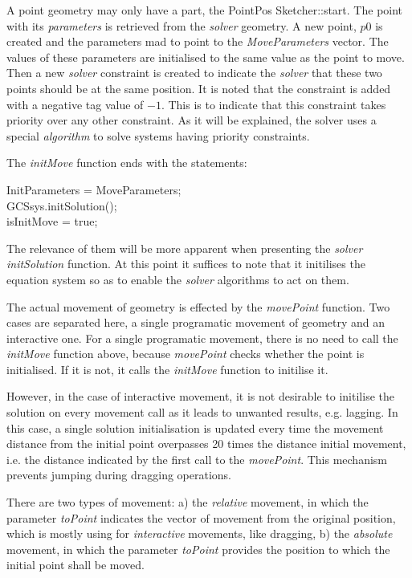 \documentclass[12pt,twoside,a4paper]{book}
\begin{document}
    A point geometry may only have a part, the PointPos Sketcher::start. The point with its \emph{parameters} is retrieved from the \emph{solver} geometry. A new point, $p0$ is created and the parameters mad to point to the \emph{MoveParameters} vector. The values of these parameters are initialised to the same value as the point to move. Then a new \emph{solver} constraint is created to indicate the \emph{solver} that these two points should be at the same position. It is noted that the constraint is added with a negative tag value of $-1$. This is to indicate that this constraint takes priority over any other constraint. As it will be explained, the solver uses a special \emph{algorithm} to solve systems having priority constraints.

    The \emph{initMove} function ends with the statements:

    \begin{codequote}
    InitParameters = MoveParameters;\\
    GCSsys.initSolution();\\
    isInitMove = true;\\
    \end{codequote}

    The relevance of them will be more apparent when presenting the \emph{solver} \emph{initSolution} function. At this point it suffices to note that it initilises the equation system so as to enable the \emph{solver} algorithms to act on them.

    The actual movement of geometry is effected by the \emph{movePoint} function. Two cases are separated here, a single programatic movement of geometry and an interactive one. For a single programatic movement, there is no need to call the \emph{initMove} function above, because \emph{movePoint} checks whether the point is initialised. If it is not, it calls the \emph{initMove} function to initilise it.

    However, in the case of interactive movement, it is not desirable to initilise the solution on every movement call as it leads to unwanted results, e.g. lagging. In this case, a single solution initialisation is updated every time the movement distance from the initial point overpasses 20 times the distance initial movement, i.e. the distance indicated by the first call to the \emph{movePoint}. This mechanism prevents jumping during dragging operations.

    There are two types of movement: a) the \emph{relative} movement, in which the parameter \emph{toPoint} indicates the vector of movement from the original position, which is mostly using for \emph{interactive} movements, like dragging, b) the \emph{absolute} movement, in which the parameter \emph{toPoint} provides the position to which the initial point shall be moved.
\end{document}
